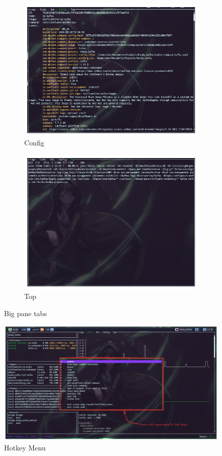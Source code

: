 \documentclass[10pt , a4paper]{report}
\begin{document}
\begin{figure}[htbp]
\begin{subfigure}{.5\textwidth}
    \centering
    \includegraphics[width=.8\linewidth]{imgs/LazyDockerConfig.png}
    \caption{Config}
    \label{fig:ld_config_pane}
\end{subfigure}%
\begin{subfigure}{.5\textwidth}
    \centering
    \includegraphics[width=.8\linewidth]{imgs/LazyDockerTopPane.png}
    \caption{Top}
    \label{fig:ld_top_pane}
\end{subfigure}
\caption{Big pane tabs}
\end{figure}

\begin{figure}[htbp]
    \centering
    \includegraphics[width=.9\linewidth]{imgs/LazyDockerHotKeysMenu.png}
    \caption{Hotkey Menu}
    \label{fig:enter-label}
\end{figure}
\end{document}
